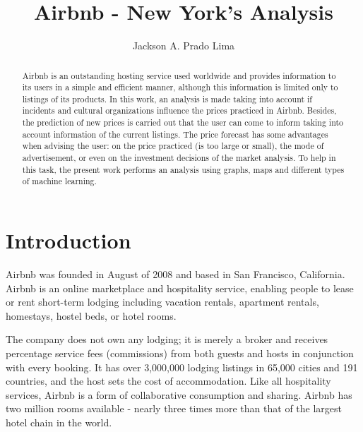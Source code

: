 \documentclass[sigconf]{acmart}
\begin{document}
	
\title{Airbnb - New York’s Analysis}

\author{Jackson A. Prado Lima}
	
\renewcommand{\shortauthors}{J. A. Prado Lima}
\renewcommand{\shorttitle}{Airbnb - New York’s Analysis}

\begin{abstract}
	Airbnb is an outstanding hosting service used worldwide and provides information to its users in a simple and efficient manner, although this information is limited only to listings of its products. In this work, an analysis is made taking into account if incidents and cultural organizations influence the prices practiced in Airbnb. Besides, the prediction of new prices is carried out that the user can come to inform taking into account information of the current listings. The price forecast has some advantages when advising the user: on the price practiced (is too large or small), the mode of advertisement, or even on the investment decisions of the market analysis. To help in this task, the present work performs an analysis using graphs, maps and different types of machine learning.
\end{abstract}


\maketitle

\vspace{-0.5cm}
\section{Introduction}

Airbnb was founded in August of 2008 and based in San Francisco, California. Airbnb is an online marketplace and hospitality service, enabling people to lease or rent short-term lodging including vacation rentals, apartment rentals, homestays, hostel beds, or hotel rooms. 

The company does not own any lodging; it is merely a broker and receives percentage service fees (commissions) from both guests and hosts in conjunction with every booking. It has over 3,000,000 lodging listings in 65,000 cities and 191 countries, and the host sets the cost of accommodation. Like all hospitality services, Airbnb is a form of collaborative consumption and sharing. Airbnb has two million rooms available - nearly three times more than that of the largest hotel chain in the world. 
\end{document}
